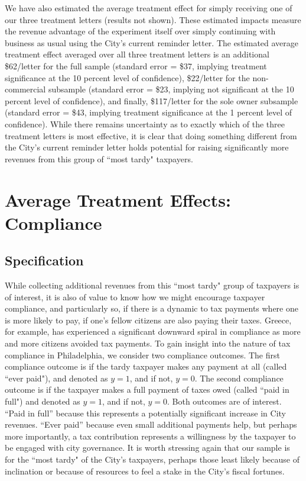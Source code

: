 \documentclass[12pt,titlepage]{article}
\begin{document}
We have also estimated the average treatment effect for simply 
receiving one of our three treatment letters (results not shown).   
These estimated impacts measure the revenue advantage of the 
experiment itself over simply continuing with business as usual 
using the City's current reminder letter.  The estimated average 
treatment effect averaged over all three treatment letters is an 
additional \$62/letter for the full sample (standard error = \$37, 
implying treatment significance at the 10 percent level of confidence), 
\$22/letter for the non-commercial subsample (standard error = \$23, 
implying not significant at the 10 percent level of confidence), 
and finally, \$117/letter for the sole owner subsample (standard 
error = \$43, implying treatment significance at the 1 percent 
level of confidence).  While there remains uncertainty as to 
exactly which of the three treatment letters is most effective, 
it is clear that doing something different from the City's current 
reminder letter holds potential for raising significantly more 
revenues from this group of ``most tardy" taxpayers.  

\section{Average Treatment Effects: Compliance}

\subsection{Specification}

While collecting additional revenues from this ``most tardy" group 
of taxpayers is of interest, it is also of value to know how we 
might encourage taxpayer compliance, and particularly so, if 
there is a dynamic to tax payments where one is more likely to 
pay, if one's fellow citizens are also paying their taxes.   
Greece, for example, has experienced a significant downward spiral 
in compliance as more and more citizens avoided tax payments.   
To gain insight into the nature of tax compliance in Philadelphia, 
we consider two compliance outcomes.   The first compliance outcome 
is if the tardy taxpayer makes any payment at all (called ``ever paid"), 
and denoted as $y = 1$, and if not, $y = 0$.   The second compliance 
outcome is if the taxpayer makes a full payment of taxes owed (called 
``paid in full") and denoted as $y = 1$, and if not, $y = 0$.  Both outcomes 
are of interest.  “Paid in full” because this represents a potentially 
significant increase in City revenues.   “Ever paid” because even small 
additional payments help, but perhaps more importantly, a tax 
contribution represents a willingness by the taxpayer to be engaged 
with city governance.  It is worth stressing again that our sample is 
for the ``most tardy" of the City's taxpayers, perhaps those least 
likely because of inclination or because of resources to feel a stake 
in the City's fiscal fortunes.    
\end{document}
